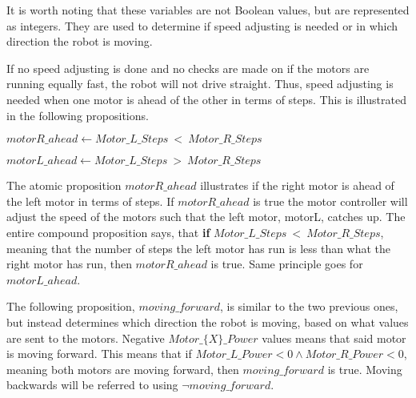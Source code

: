 \begin{comment}
The following $Motor\_\{X\}\_Steps$ variables are values returned from the motors;

\hspace{3mm} $Motor\_L\_Steps$

\hspace{3mm} $Motor\_R\_Steps$

and the $Motor\_\{X\}\_Power$ variables are information given to the motors about how fast they should run.

\hspace{3mm} $Motor\_L\_Power$

\hspace{3mm} $Motor\_R\_Power$

The variable below is the target step to reach for the robot. 

\hspace{3mm} $Target\_Steps$
\end{comment}

It is worth noting that these variables are not Boolean values, but are represented as integers. They are used to determine if speed adjusting is needed or in which direction the robot is moving.

If no speed adjusting is done and no checks are made on if the motors are running equally fast, the robot will not drive straight. Thus, speed adjusting is needed when one motor is ahead of the other in terms of steps. This is illustrated in the following propositions.

\hspace{3mm} $motorR\_ahead \leftarrow Motor\_L\_Steps~<~Motor\_R\_Steps$

\hspace{3mm} $motorL\_ahead \leftarrow Motor\_L\_Steps~>~Motor\_R\_Steps$ 

The atomic proposition $motorR\_ahead$ illustrates if the right motor is ahead of the left motor in terms of steps. If $motorR\_ahead$ is true the motor controller will adjust the speed of the motors such that the left motor, motorL, catches up. The entire compound proposition says, that \textbf{if} $Motor\_L\_Steps~<~Motor\_R\_Steps$, meaning that the number of steps the left motor has run is less than what the right motor has run, then $motorR\_ahead$ is true. Same principle goes for $motorL\_ahead$. 

The following proposition, $moving\_forward$, is similar to the two previous ones, but instead determines which direction the robot is moving, based on what values are sent to the motors. Negative $Motor\_\{X\}\_Power$ values means that said motor is moving forward. This means that if $Motor\_L\_Power < 0 \land Motor\_R\_Power < 0$, meaning both motors are moving forward, then $moving\_forward$ is true. Moving backwards will be referred to using $\lnot moving\_forward$.

